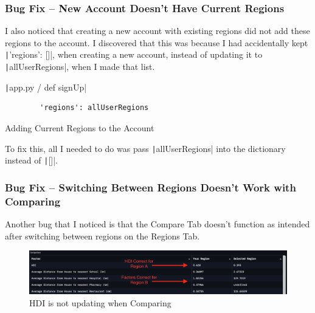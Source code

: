 \documentclass[12pt]{report}
\newcommand{\pil}[1]{\protect\texttt|#1|}
\begin{document}
\subsubsection{Bug Fix -- New Account Doesn't Have Current Regions}
I also noticed that creating a new account with existing regions did not add these regions to the account. I discovered that this was because I had accidentally kept \pil{'regions': []}, when creating a new account, instead of updating it to \pil{allUserRegions}, when I made that list.

\begin{listing}[H]
\pil{app.py / def signUp}
\begin{verbatim}
        'regions': allUserRegions
\end{verbatim}
\caption{Adding Current Regions to the Account}\label{cs:addCurrentRegionsToAccount}
\end{listing}

To fix this, all I needed to do was pass \pil{allUserRegions} into the dictionary instead of \pil{[]}.

\begin{center}
\end{center}

\subsubsection{Bug Fix -- Switching Between Regions Doesn't Work with Comparing}
Another bug that I noticed is that the Compare Tab doesn't function as intended after switching between regions on the Regions Tab.

\begin{figure}[H]
\centering
\includegraphics[width=14cm]{ss22.4.png}
\caption{HDI is not updating when Comparing}\label{fig:ss22.4}
\end{figure}
\end{document}
